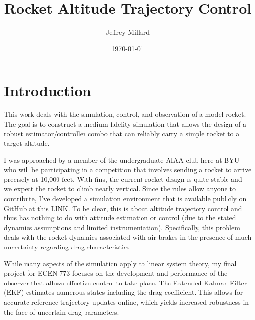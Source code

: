 \documentclass{article}
\title{Rocket Altitude Trajectory Control}
\date{\today}
\author{Jeffrey Millard}
\begin{document}
\maketitle


\section{Introduction}
  This work deals with the simulation, control, and observation of a model rocket. The goal is to construct a medium-fidelity simulation that allows the design of a robust estimator/controller combo that can reliably carry a simple rocket to a target altitude.

  I was approached by a member of the undergraduate AIAA club here at BYU who will be participating in a competition that involves sending a rocket to arrive precisely at 10,000 feet. With fins, the current rocket design is quite stable and we expect the rocket to climb nearly vertical. Since the rules allow anyone to contribute, I've developed a simulation environment that is available publicly on GitHub at this \href{https://github.com/jdmillard/rocket-altitude}{LINK}. To be clear, this is about altitude trajectory control and thus has nothing to do with attitude estimation or control (due to the stated dynamics assumptions and limited instrumentation). Specifically, this problem deals with the rocket dynamics associated with air brakes in the presence of much uncertainty regarding drag characteristics.

  While many aspects of the simulation apply to linear system theory, my final project for ECEN 773 focuses on the development and performance of the observer that allows effective control to take place. The Extended Kalman Filter (EKF) estimates numerous states including the drag coefficient. This allows for accurate reference trajectory updates online, which yields increased robustness in the face of uncertain drag parameters.
\end{document}
